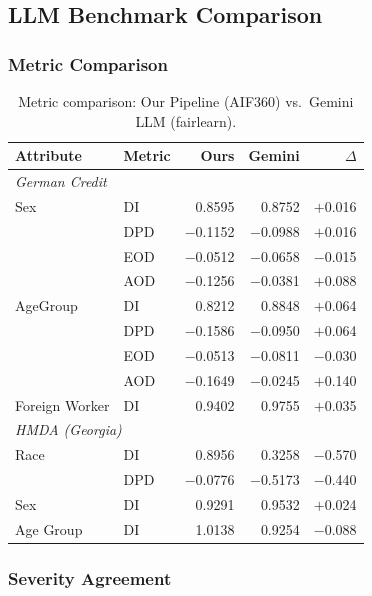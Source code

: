 \documentclass[11pt,a4paper]{article}
\begin{document}
\subsection{LLM Benchmark Comparison}

\subsubsection{Metric Comparison}

\begin{table}[H]
\centering
\caption{Metric comparison: Our Pipeline (AIF360) vs.\ Gemini LLM (fairlearn).}
\label{tab:benchmark}
\small
\begin{tabular}{llrrr}
\toprule
\textbf{Attribute} & \textbf{Metric} & \textbf{Ours} & \textbf{Gemini} & \textbf{$\Delta$} \\
\midrule
\multicolumn{5}{l}{\textit{German Credit}} \\
Sex             & DI  & 0.8595 & 0.8752 & $+$0.016 \\
                & DPD & $-$0.1152 & $-$0.0988 & $+$0.016 \\
                & EOD & $-$0.0512 & $-$0.0658 & $-$0.015 \\
                & AOD & $-$0.1256 & $-$0.0381 & $+$0.088 \\
AgeGroup        & DI  & 0.8212 & 0.8848 & $+$0.064 \\
                & DPD & $-$0.1586 & $-$0.0950 & $+$0.064 \\
                & EOD & $-$0.0513 & $-$0.0811 & $-$0.030 \\
                & AOD & $-$0.1649 & $-$0.0245 & $+$0.140 \\
Foreign Worker  & DI  & 0.9402 & 0.9755 & $+$0.035 \\
\midrule
\multicolumn{5}{l}{\textit{HMDA (Georgia)}} \\
Race            & DI  & 0.8956 & 0.3258 & $-$0.570 \\
                & DPD & $-$0.0776 & $-$0.5173 & $-$0.440 \\
Sex             & DI  & 0.9291 & 0.9532 & $+$0.024 \\
Age Group       & DI  & 1.0138 & 0.9254 & $-$0.088 \\
\bottomrule
\end{tabular}
\end{table}

\subsubsection{Severity Agreement}
\end{document}
